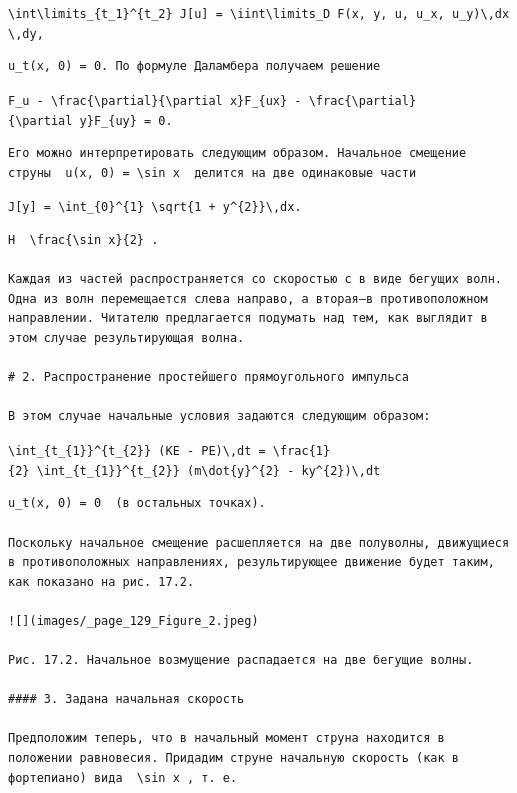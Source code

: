 \documentclass[
  ukrainian,
]{article}
\begin{document}
\texttt{\textbackslash{}int\textbackslash{}limits\_\{t\_1\}\^{}\{t\_2\}\ J{[}u{]}\ =\ \textbackslash{}iint\textbackslash{}limits\_D\ F(x,\ y,\ u,\ u\_x,\ u\_y)\textbackslash{},dx\textbackslash{},dy,}

\begin{verbatim}
u_t(x, 0) = 0. По формуле Даламбера получаем решение
\end{verbatim}

\texttt{F\_u\ -\ \textbackslash{}frac\{\textbackslash{}partial\}\{\textbackslash{}partial\ x\}F\_\{ux\}\ -\ \textbackslash{}frac\{\textbackslash{}partial\}\{\textbackslash{}partial\ y\}F\_\{uy\}\ =\ 0.}

\begin{verbatim}
Его можно интерпретировать следующим образом. Начальное смещение струны  u(x, 0) = \sin x  делится на две одинаковые части
\end{verbatim}

\texttt{J{[}y{]}\ =\ \textbackslash{}int\_\{0\}\^{}\{1\}\ \textbackslash{}sqrt\{1\ +\ y\textquotesingle{}\^{}\{2\}\}\textbackslash{},dx.}

\begin{verbatim}
H  \frac{\sin x}{2} .

Каждая из частей распространяется со скоростью с в виде бегущих волн. Одна из волн перемещается слева направо, а вторая—в противоположном направлении. Читателю предлагается подумать над тем, как выглядит в этом случае результирующая волна.

# 2. Распространение простейшего прямоугольного импульса

В этом случае начальные условия задаются следующим образом:
\end{verbatim}

\texttt{\textbackslash{}int\_\{t\_\{1\}\}\^{}\{t\_\{2\}\}\ (KE\ -\ PE)\textbackslash{},dt\ =\ \textbackslash{}frac\{1\}\{2\}\ \textbackslash{}int\_\{t\_\{1\}\}\^{}\{t\_\{2\}\}\ (m\textbackslash{}dot\{y\}\^{}\{2\}\ -\ ky\^{}\{2\})\textbackslash{},dt}

\begin{verbatim}
u_t(x, 0) = 0  (в остальных точках).

Поскольку начальное смещение расшепляется на две полуволны, движущиеся в противоположных направлениях, результирующее движение будет таким, как показано на рис. 17.2.

![](images/_page_129_Figure_2.jpeg)

Рис. 17.2. Начальное возмущение распадается на две бегущие волны.

#### 3. Задана начальная скорость

Предположим теперь, что в начальный момент струна находится в положении равновесия. Придадим струне начальную скорость (как в фортепиано) вида  \sin x , т. е.
\end{verbatim}
\end{document}
